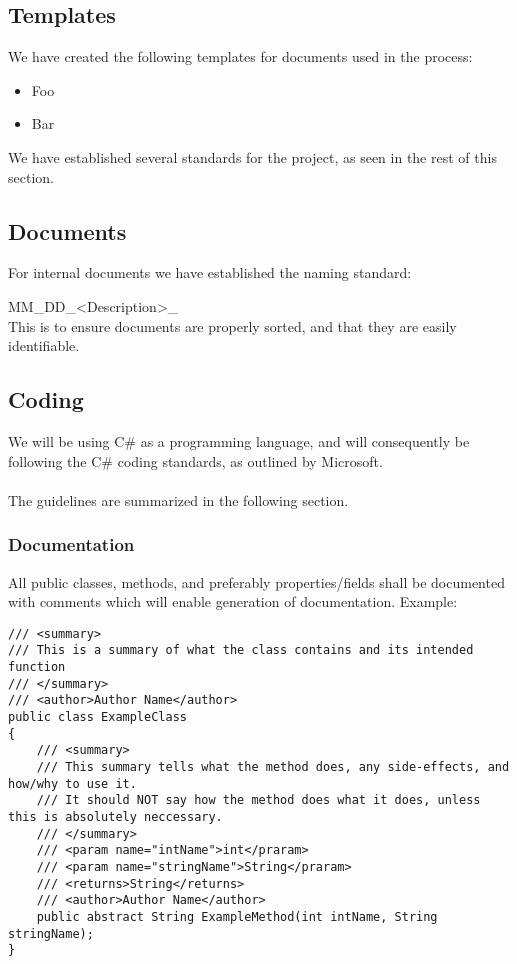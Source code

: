 
\subsection{Templates}
\label{Templates and Standards section}
We have created the following templates for documents used in the process:

\begin{itemize}

\item Foo
\item Bar

\end{itemize}
We have established several standards for the project, as seen in the rest of this section.

\subsection{Documents}
For internal documents we have established the naming standard:

MM\_DD\_<Description>\_<Version if applicable>
\\
This is to ensure documents are properly sorted, and that they are easily identifiable.



\subsection{Coding}
We will be using C\# as a programming language, and will consequently be following the C\# coding standards, as outlined by Microsoft. \cite{cCoding}
\\\\
The guidelines are summarized in the following section.\\

\subsubsection{Documentation}
All public classes, methods, and preferably properties/fields shall be documented with comments which will enable generation of documentation. Example:
\begin{lstlisting}
/// <summary>
/// This is a summary of what the class contains and its intended function
/// </summary>
/// <author>Author Name</author>
public class ExampleClass
{
	/// <summary>
	/// This summary tells what the method does, any side-effects, and how/why to use it.
	/// It should NOT say how the method does what it does, unless this is absolutely neccessary.
	/// </summary>
	/// <param name="intName">int</praram>
	/// <param name="stringName">String</praram>
	/// <returns>String</returns>
	/// <author>Author Name</author>
	public abstract String ExampleMethod(int intName, String stringName);
}
\end{lstlisting}

